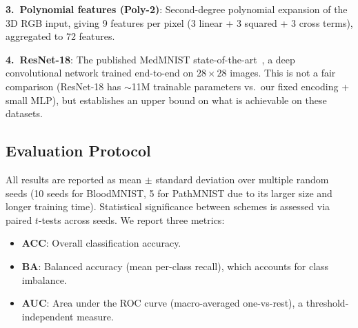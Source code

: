 \documentclass[conference,compsoc]{IEEEtran}
\begin{document}
\textbf{3.\ Polynomial features (Poly-2)}: Second-degree polynomial expansion of the 3D RGB input, giving 9 features per pixel (3 linear + 3 squared + 3 cross terms), aggregated to 72 features.

\textbf{4.\ ResNet-18}: The published MedMNIST state-of-the-art~\cite{yang2023medmnist}, a deep convolutional network trained end-to-end on $28 \times 28$ images.
This is not a fair comparison (ResNet-18 has $\sim$11M trainable parameters vs.\ our fixed encoding + small MLP), but establishes an upper bound on what is achievable on these datasets.


\subsection{Evaluation Protocol}
\label{sec:eval}

All results are reported as mean $\pm$ standard deviation over multiple random seeds (10 seeds for BloodMNIST, 5 for PathMNIST due to its larger size and longer training time).
Statistical significance between schemes is assessed via paired $t$-tests across seeds.
We report three metrics:
\begin{itemize}
    \item \textbf{ACC}: Overall classification accuracy.
    \item \textbf{BA}: Balanced accuracy (mean per-class recall), which accounts for class imbalance.
    \item \textbf{AUC}: Area under the ROC curve (macro-averaged one-vs-rest), a threshold-independent measure.
\end{itemize}
\end{document}
